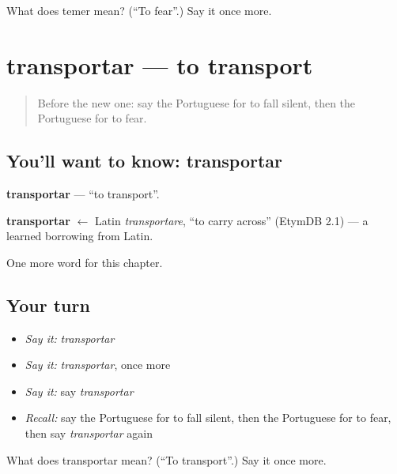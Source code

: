 \begin{tcolorbox}[breakable,colback=teal!4,colframe=teal!35!black,title={Before you move on}]
What does temer mean? (\textquotedblleft{}To fear\textquotedblright{}.) Say it once more.
\end{tcolorbox}
\section[transportar]{transportar — to transport}

\label{lesson:PT-C144-transportar}



\begin{quote}
Before the new one: say the Portuguese for to fall silent, then the Portuguese for to fear.
\end{quote}

\subsection*{You'll want to know: transportar}
\textbf{transportar} — \textquotedblleft{}to transport\textquotedblright{}.

\begin{cousinweb}
\textbf{transportar} $\leftarrow$ Latin \emph{transportare}, \textquotedblleft{}to carry across\textquotedblright{} (EtymDB 2.1) — a learned borrowing from Latin.
\end{cousinweb}

\begin{grammarlens}[title={What you've built}]
One more word for this chapter.
\end{grammarlens}

\subsection*{Your turn}
\begin{itemize}
\raggedright
  \item \emph{Say it:} \emph{transportar}
  \item \emph{Say it:} \emph{transportar}, once more
  \item \emph{Say it:} say \emph{transportar}
  \item \emph{Recall:} say the Portuguese for to fall silent, then the Portuguese for to fear, then say \emph{transportar} again
\end{itemize}

\begin{tcolorbox}[breakable,colback=teal!4,colframe=teal!35!black,title={Before you move on}]
What does transportar mean? (\textquotedblleft{}To transport\textquotedblright{}.) Say it once more.
\end{tcolorbox}
